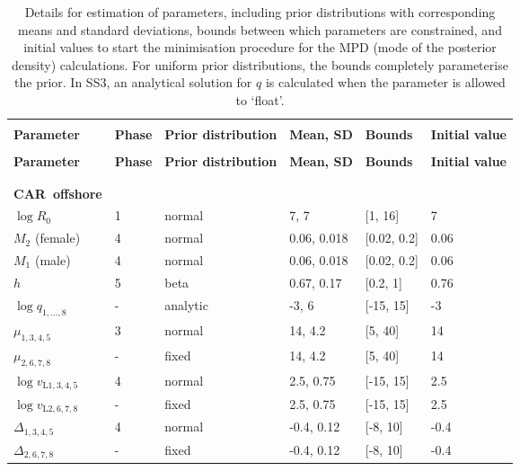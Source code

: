 \documentclass[11pt]{book}
\def\bfTh{{\bf \Theta}}%
\newcommand{\comment}[1]{}                    %
\def\bfTh{{\bf \Theta}}          %
\newcommand{\eref}[1]{(\ref{#1})}
\begin{document}

\begin{longtable}{L{1in}C{1.0in}C{1.0in}C{1.0in}C{1.0in}C{1.4in}}
\caption{Details for estimation of parameters, including prior distributions with corresponding means and standard deviations, bounds between which parameters are constrained, and initial values to start the minimisation procedure for the MPD (mode of the posterior density) calculations. For uniform prior distributions, the bounds completely parameterise the prior. In SS3, an analytical solution for $q$ is calculated when the parameter is allowed to `float'.}
\comment{
}
\label{tab:priors}
\\ \hline\\[-2.2ex]
\textbf{Parameter} & \textbf{Phase} & \textbf{Prior distribution} & \textbf{Mean, SD} & \textbf{Bounds} & \textbf{Initial value}
\\[0.2ex]\hline\\[-1.5ex] \endfirsthead \hline 
\textbf{Parameter} & \textbf{Phase} & \textbf{Prior distribution} & \textbf{Mean, SD} & \textbf{Bounds} & \textbf{Initial value}
\\[0.2ex]\hline\\[-1.5ex] \endhead
\hline\\[-2.2ex]   \endfoot  \hline \endlastfoot  %

\textbf{CAR~offshore} &   &          &              &             &\\
$\log R_0$                    & 1 & normal   & 7, 7         & [1, 16]     &  7\\
$M_{2}$ (female)              & 4 & normal   & 0.06, 0.018  & [0.02, 0.2] &  0.06\\
$M_{1}$ (male)                & 4 & normal   & 0.06, 0.018  & [0.02, 0.2] &  0.06\\
$h$                           & 5 & beta     & 0.67, 0.17   & [0.2, 1]    &  0.76\\
$\log q_{1,...,8}$            & - & analytic & -3,   6      & [-15, 15]   & -3\\
$\mu_{1,3,4,5}$               & 3 & normal   & 14, 4.2      & [5, 40]     & 14\\
$\mu_{2,6,7,8}$               & - & fixed    & 14, 4.2      & [5, 40]     & 14\\
$\log v_{\text{L}1,3,4,5}$    & 4 & normal   & 2.5, 0.75    & [-15, 15]   & 2.5\\
$\log v_{\text{L}2,6,7,8}$    & - & fixed    & 2.5, 0.75    & [-15, 15]   & 2.5\\
$\Delta_{1,3,4,5}$            & 4 & normal   & -0.4, 0.12   & [-8, 10]    & -0.4\\
$\Delta_{2,6,7,8}$            & - & fixed    & -0.4, 0.12   & [-8, 10]    & -0.4\\
\hline  
\end{longtable}
\end{document}
